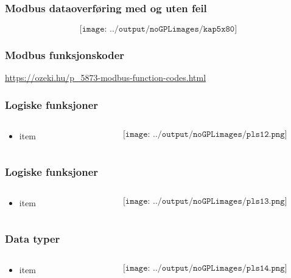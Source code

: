 \documentclass[aspectratio=169,xcolor=dvipsnames]{beamer}
\begin{document}
\begin{frame}
	\frametitle{Modbus dataoverføring med og uten feil}
	$$\texttt{[image: ../output/noGPLimages/kap5x80]}$$
\end{frame}
\begin{frame}
	\frametitle{Modbus funksjonskoder}

	\url{https://ozeki.hu/p_5873-modbus-function-codes.html}

\end{frame}

\begin{frame}
	\frametitle{Logiske funksjoner}
	\begin{columns}
		\begin{column}{0.5\textwidth}
			\begin{itemize}
				\item item
			\end{itemize}

			
		\end{column}

		\begin{column}{0.5\textwidth}
	$$\texttt{[image: ../output/noGPLimages/pls12.png]}$$
		\end{column}
	\end{columns}
\end{frame}

\begin{frame}
	\frametitle{Logiske funksjoner}
	\begin{columns}
		\begin{column}{0.5\textwidth}
			\begin{itemize}
				\item item
			\end{itemize}

			
		\end{column}

		\begin{column}{0.5\textwidth}
	$$\texttt{[image: ../output/noGPLimages/pls13.png]}$$
		\end{column}
	\end{columns}
\end{frame}

\begin{frame}
	\frametitle{Data typer}
	\begin{columns}
		\begin{column}{0.5\textwidth}
			\begin{itemize}
				\item item
			\end{itemize}

			
		\end{column}

		\begin{column}{0.5\textwidth}
	$$\texttt{[image: ../output/noGPLimages/pls14.png]}$$
		\end{column}
	\end{columns}
\end{frame}
\end{document}
